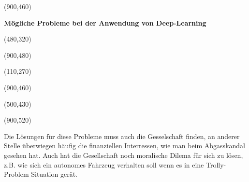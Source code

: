 \documentclass[36pt,extrafontsizes,article,oneside,final]{memoir}
\begin{document}
\begin{minipage}[c][\textheight-50pt][t]{0.50\textwidth}
\begin{center}
\makebox(900,460){
\parbox{900pt}{
\begin{center}
\begin{Spacing}{2}
\textbf{
\huge
Mögliche Probleme bei der Anwendung von Deep-Learning
}
\end{Spacing}
\end{center}
}}

\makebox(480,320){
}

\colorbox{gray!20}{
\makebox(900,480){
\large
{}}}

\makebox(110,270){
}

\colorbox{gray!20}{
\makebox(900,460){
\large
{}}}

\makebox(500,430){
}

\colorbox{gray!20}{
\makebox(900,520){
\parbox{850pt}{

\large

Die Lösungen für diese Probleme muss auch die Gesselschaft finden, an anderer Stelle überwiegen häufig die finanziellen Interressen, wie man beim Abgasskandal gesehen hat. Auch hat die Gesellschaft noch moralische Dilema für sich zu lösen, z.B. wie sich ein autonomes Fahrzeug verhalten soll wenn es in eine Trolly-Problem Situation gerät.

}}}

\end{center}
\end{minipage}
\end{document}

